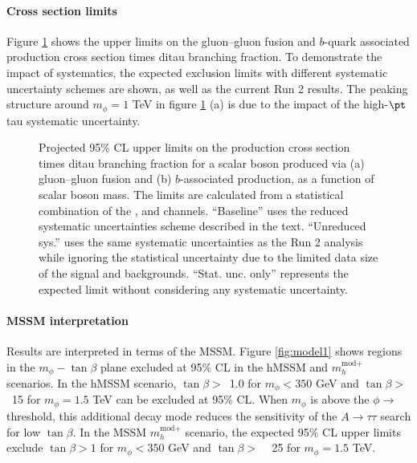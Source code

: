 \paragraph{Cross section limits}
Figure \ref{fig:modelInde} shows the upper limits on the gluon--gluon fusion and $b$-quark associated production 
cross section times ditau branching fraction. To demonstrate the impact of systematics, the expected exclusion limits
with different systematic uncertainty schemes are shown, as well as the current Run 2 results\cite{ATLASRun2Ditau}.
The peaking structure around $m_\phi = 1$ TeV in figure \ref{fig:modelInde} (a) is due to the impact of 
the high-$\pt$ tau systematic uncertainty. 

\begin{figure}[!ht]
    \centering
        \qquad
        \caption{Projected 95\% CL upper limits on the production cross section times ditau branching fraction 
        for a scalar boson produced via (a) gluon--gluon fusion and (b) $b$-associated production, as a function 
        of scalar boson mass. The limits are calculated from a statistical combination of the \ehad, \muhad 
        and \hadhad channels. ``Baseline'' uses the reduced systematic uncertainties scheme described in the text.
        ``Unreduced sys.'' uses the same systematic uncertainties as the Run 2 analysis while ignoring 
        the statistical uncertainty due to the limited data size of the signal and backgrounds. 
        ``Stat. unc. only'' represents the expected limit without considering any systematic uncertainty.
        }
    \label{fig:modelInde}
\end{figure}

\paragraph{MSSM interpretation}
Results are interpreted in terms of the MSSM. Figure \ref{fig:model1} shows regions in the $m_\phi-\tan\beta$ 
plane excluded at 95\% CL in the hMSSM and $m_{h}^{\text{mod}+}$ scenarios. In the hMSSM scenario, 
$\tan\beta >$~1.0 for $m_\phi < 350$ GeV and $\tan\beta >$~15 for $m_\phi = 1.5$ TeV can be excluded at 95\% CL. 
When $m_\phi$ is above the $\phi\to$\ttbar threshold, this additional decay mode reduces the sensitivity 
of the $A\to\tau\tau$ search for low $\tan\beta$. In the MSSM $m_{h}^{\text{mod}+}$ scenario, 
the expected 95\% CL upper limits exclude $\tan\beta >1$ for $m_\phi< 350$ GeV and $\tan\beta >$ ~ 25 
for $m_\phi = 1.5$ TeV.

